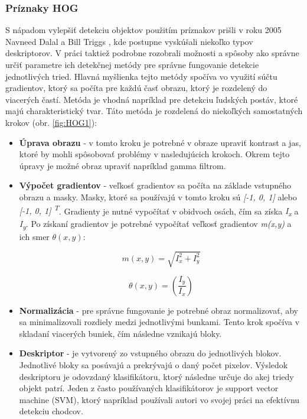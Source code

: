\documentclass[slovak,master,dept460,male,cpp,cpdeclaration]{diploma}
\begin{document}
\subsubsection*{Príznaky HOG}
\label{HOG}
S nápadom  vylepšiť detekciu objektov použitím príznakov prišli v roku 2005 Navneed Dalal a Bill Triggs \cite{dalal2005}, kde postupne vyskúšali niekoľko typov deskriptorov.  V práci taktiež podrobne rozobrali  možnosti a spôsoby ako správne určiť parametre ich detekčnej metódy pre správne fungovanie detekcie jednotlivých tried. Hlavná myšlienka tejto metódy spočíva vo využití súčtu gradientov, ktorý sa počíta pre  každú časť obrazu, ktorý je rozdelený do viacerých častí. Metóda je vhodná napríklad pre detekciu ľudských postáv, ktoré majú charakteristický tvar. Táto metóda je rozdelená do niekoľkých samostatných krokov (obr. \ref{fig:HOG1}):
\begin{itemize}
  \item \textbf{Úprava obrazu} - v tomto kroku je potrebné  v obraze upraviť kontrast a jas, ktoré by mohli spôsobovať  problémy v nasledujúcich krokoch. Okrem tejto úpravy  je možné obraz upraviť napríklad gamma filtrom.
  \item \textbf{Výpočet gradientov} - veľkosť gradientov sa počíta na základe vstupného obrazu a masky. Masky, ktoré sa používajú v tomto kroku sú \textit{[-1, 0, 1]} alebo \textit{[-1, 0, 1] \textsuperscript{T}}. Gradienty je nutné vypočítať v obidvoch osách, čím sa získa \textit{I\textsubscript{x}} a \textit{I\textsubscript{y}}. Po získaní gradientov je potrebné vypočítať veľkosť gradientov \textit{m(x,y)} a ich smer \textit{$\theta(x, y)$}:
  
\begin{equation}
m(x,y)= \sqrt{I_{x}^{2} + I_{y}^{2}}
\label{eq:Výpočet veľkosti gradientu}
\end{equation}

  \begin{equation}
\theta(x, y) = \left(\frac{I_{y}}{I_{x}}\right)
\label{eq:Výpočet smeru gradientu}
\end{equation}
  \item \textbf{Normalizácia} -  pre správne fungovanie je potrebné obraz normalizovať, aby sa minimalizovali rozdiely medzi jednotlivými bunkami. Tento krok spočíva v skladaní viacerých buniek, čím následne vznikajú bloky. 
   \item \textbf{Deskriptor} -  je vytvorený zo vstupného obrazu do jednotlivých blokov. Jednotlivé bloky sa posúvajú a prekrývajú o daný počet pixelov. Výsledok deskriptoru je odovzdaný  klasifikátoru, ktorý následne určuje do akej triedy objekt patrí. Jeden z často používaných klasifikátorov je support vector machine (SVM), ktorý napríklad používali autori vo svojej práci na efektívnu detekciu chodcov\cite{pang2011efficient}.
 \end{itemize}
\end{document}
